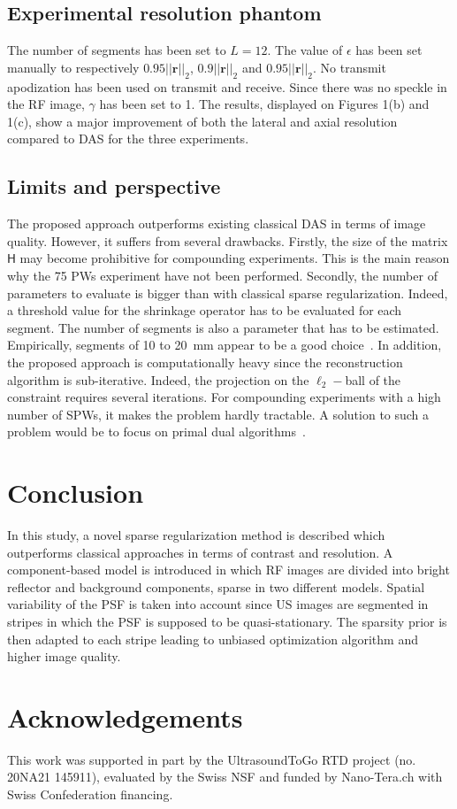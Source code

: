 \documentclass[conference]{IEEEtran}
\begin{document}
\subsection{Experimental resolution phantom}
\label{subsec_res_exp_resolution}
The number of segments has been set to $L = 12$. The value of $\epsilon$ has been set manually to respectively $0.95 || \bm{r} ||_2$, $0.9 || \bm{r} ||_2$ and $0.95 || \bm{r} ||_2$.  No transmit apodization has been used on transmit and receive. Since there was no speckle in the RF image, $\gamma$ has been set to 1.
The results, displayed on Figures 1(b) and 1(c), show a major improvement of both the lateral and axial resolution compared to DAS for the three experiments. 
\subsection{Limits and perspective}
\label{subsec_limitation_prop_app}
The proposed approach outperforms existing classical DAS in terms of image quality. However, it suffers from several drawbacks. Firstly, the size of the matrix $\mathsf{H}$ may become prohibitive for compounding experiments. This is the main reason why the 75 PWs experiment have not been performed. Secondly, the number of parameters to evaluate is bigger than with classical sparse regularization. Indeed, a threshold value for the shrinkage operator has to be evaluated for each segment. The number of segments is also a parameter that has to be estimated. Empirically, segments of 10 to \SI{20}{\milli\metre} appear to be a good choice~\cite{BZhang_IUS_2015}.
In addition, the proposed approach is computationally heavy since the reconstruction algorithm is sub-iterative. Indeed, the projection on the $\ell_2-$ball of the constraint requires several iterations. For compounding experiments with a high number of SPWs, it makes the problem hardly tractable. A solution to such a problem would be to focus on primal dual algorithms~\cite{Komodakis_SPM_2015}.
\section{Conclusion}
\label{sec:Conc}
In this study, a novel sparse regularization method is described which outperforms classical approaches in terms of contrast and resolution. A component-based model is introduced in which RF images are divided into bright reflector and background components, sparse in two different models. Spatial variability of the PSF is taken into account since US images are segmented in stripes in which the PSF is supposed to be quasi-stationary. The sparsity prior is then adapted to each stripe leading to unbiased optimization algorithm and higher image quality. 
\section*{Acknowledgements}
This work was supported in part by the UltrasoundToGo RTD project (no. 20NA21 145911), evaluated by the Swiss NSF and funded by Nano-Tera.ch with Swiss Confederation financing.


\end{document}
